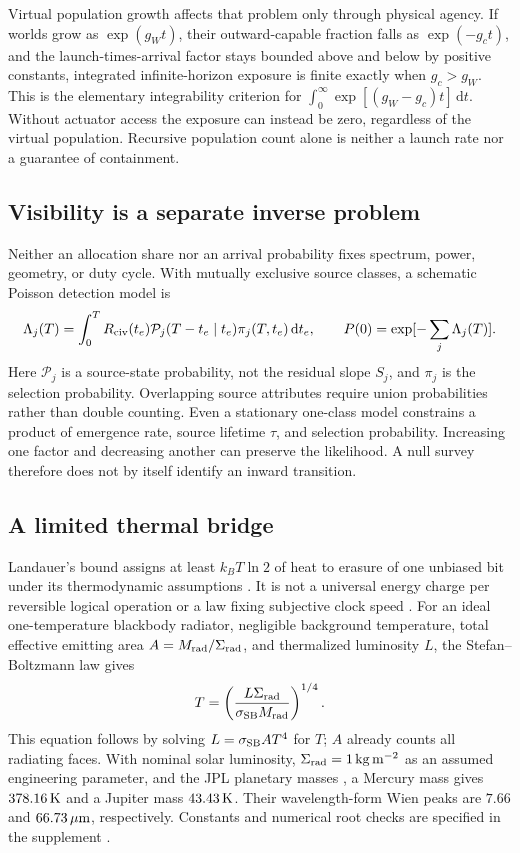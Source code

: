 \documentclass[11pt,a4paper]{article}
\theoremstyle{definition}\newtheorem{definition}{Definition}
\newcommand{\dd}{\,\mathrm{d}}
\begin{document}
Virtual population growth affects that problem only through physical
agency. If worlds grow as $\exp(g_Wt)$, their outward-capable fraction
falls as $\exp(-g_ct)$, and the launch-times-arrival factor stays bounded
above and below by positive constants, integrated infinite-horizon
exposure is finite exactly when $g_c>g_W$. This is the elementary
integrability criterion for $\int_0^\infty\exp[(g_W-g_c)t]\dd t$.
Without actuator access the exposure can instead be zero, regardless
of the virtual population. Recursive population count alone is neither
a launch rate nor a guarantee of containment.

\subsection{Visibility is a separate inverse problem}
Neither an allocation share nor an arrival probability fixes spectrum,
power, geometry, or duty cycle. With mutually exclusive source classes,
a schematic Poisson detection model is
\begin{equation}
 \Lambda_j(T)=\int_0^T R_{\rm civ}(t_e)
 \mathcal P_j(T-t_e\mid t_e)\pi_j(T,t_e)\dd t_e,
 \qquad P(0)=\exp[-\sum_j\Lambda_j(T)].
 \label{eq:observations}
\end{equation}
Here $\mathcal P_j$ is a source-state probability, not the residual slope
$S_j$, and $\pi_j$ is the selection probability. Overlapping source
attributes require union probabilities rather than double counting.
Even a stationary one-class model constrains a product of emergence
rate, source lifetime $\tau$, and selection probability. Increasing one
factor and decreasing another can preserve the likelihood. A null survey
therefore does not by itself identify an inward transition.

\subsection{A limited thermal bridge}
\label{sec:thermal-bridge}
Landauer's bound assigns at least $k_BT\ln2$ of heat to erasure of one
unbiased bit under its thermodynamic assumptions \citep{Landauer1961}.
It is not a universal energy charge per reversible logical operation or
a law fixing subjective clock speed \citep{Bennett1973}. For an ideal
one-temperature blackbody radiator, negligible background temperature,
total effective emitting area $A=M_{\rm rad}/\Sigma_{\rm rad}$, and
thermalized luminosity $L$, the Stefan--Boltzmann law gives
\begin{equation}
 T=\left(\frac{L\Sigma_{\rm rad}}{\sigma_{\rm SB}M_{\rm rad}}\right)^{1/4}.
 \label{eq:radiator}
\end{equation}
This equation follows by solving $L=\sigma_{\rm SB}AT^4$ for $T$;
$A$ already counts all radiating faces. With nominal solar luminosity,
$\Sigma_{\rm rad}=1\,{\rm kg\,m^{-2}}$ as an assumed engineering
parameter, and the JPL planetary masses \citep{JPLPhysical}, a Mercury
mass gives $378.16\,{\rm K}$ and a Jupiter mass $43.43\,{\rm K}$.
Their wavelength-form Wien peaks are $7.66$ and $66.73\,\mu{\rm m}$,
respectively. Constants and numerical root checks are specified in the
supplement \citep{NIST2022}.
\end{document}
